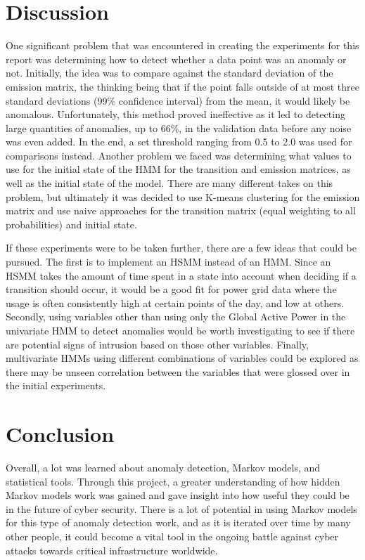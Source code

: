 \documentclass[letterpaper, 11pt]{article}%
\begin{document}
\section{Discussion}
One significant problem that was encountered in creating the experiments for this report was determining how to detect whether a data point was an anomaly or not. Initially, the idea was to compare against the standard deviation of the emission matrix, the thinking being that if the point falls outside of at most three standard deviations (99\% confidence interval) from the mean, it would likely be anomalous. Unfortunately, this method proved ineffective as it led to detecting large quantities of anomalies, up to 66\%, in the validation data before any noise was even added. In the end, a set threshold ranging from 0.5 to 2.0 was used for comparisons instead. Another problem we faced was determining what values to use for the initial state of the HMM for the transition and emission matrices, as well as the initial state of the model. There are many different takes on this problem, but ultimately it was decided to use K-means clustering for the emission matrix and use naive approaches for the transition matrix (equal weighting to all probabilities) and initial state.

If these experiments were to be taken further, there are a few ideas that could be pursued. The first is to implement an HSMM instead of an HMM. Since an HSMM takes the amount of time spent in a state into account when deciding if a transition should occur, it would be a good fit for power grid data where the usage is often consistently high at certain points of the day, and low at others. Secondly, using variables other than using only the Global Active Power in the univariate HMM to detect anomalies would be worth investigating to see if there are potential signs of intrusion based on those other variables. Finally, multivariate HMMs using different combinations of variables could be explored as there may be unseen correlation between the variables that were glossed over in the initial experiments.

\section{Conclusion}
Overall, a lot was learned about anomaly detection, Markov models, and statistical tools. Through this project, a greater understanding of how hidden Markov models work was gained and gave insight into how useful they could be in the future of cyber security. There is a lot of potential in using Markov models for this type of anomaly detection work, and as it is iterated over time by many other people, it could become a vital tool in the ongoing battle against cyber attacks towards critical infrastructure worldwide.
\end{document}
